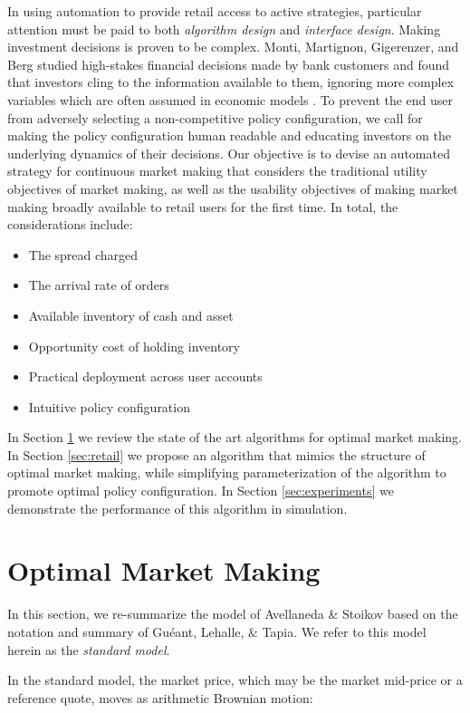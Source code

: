\documentclass{article}
\begin{document}
In using automation to provide retail access to active strategies, particular attention must be paid to both \emph{algorithm design} and \emph{interface design}. Making investment decisions is proven to be complex. Monti, Martignon, Gigerenzer, and Berg studied high-stakes financial decisions made by bank customers and found that investors cling to the information available to them, ignoring more complex variables which are often assumed in economic models \cite{monti2009impact}. To prevent the end user from adversely selecting a non-competitive policy configuration, we call for making the policy configuration human readable and educating investors on the underlying dynamics of their decisions. Our objective is to devise an automated strategy for continuous market making that considers the traditional utility objectives of market making, as well as the usability objectives of making market making broadly available to retail users for the first time. In total, the considerations include:

\begin{itemize}
  \item The spread charged
  \item The arrival rate of orders
  \item Available inventory of cash and asset
  \item Opportunity cost of holding inventory
  \item Practical deployment across user accounts
  \item Intuitive policy configuration
\end{itemize}

In Section \ref{sec:optimal} we review the state of the art algorithms for optimal market making. In Section \ref{sec:retail} we propose an algorithm that mimics the structure of optimal market making, while simplifying parameterization of the algorithm to promote optimal policy configuration. In Section \ref{sec:experiments} we demonstrate the performance of this algorithm in simulation.

\section{Optimal Market Making}
\label{sec:optimal}

In this section, we re-summarize the model of Avellaneda \& Stoikov based on the notation and summary of Guéant, Lehalle, \& Tapia. We refer to this model herein as the \emph{standard model}.

In the standard model, the market price, which may be the market mid-price or a reference quote, moves as arithmetic Brownian motion:
\end{document}
